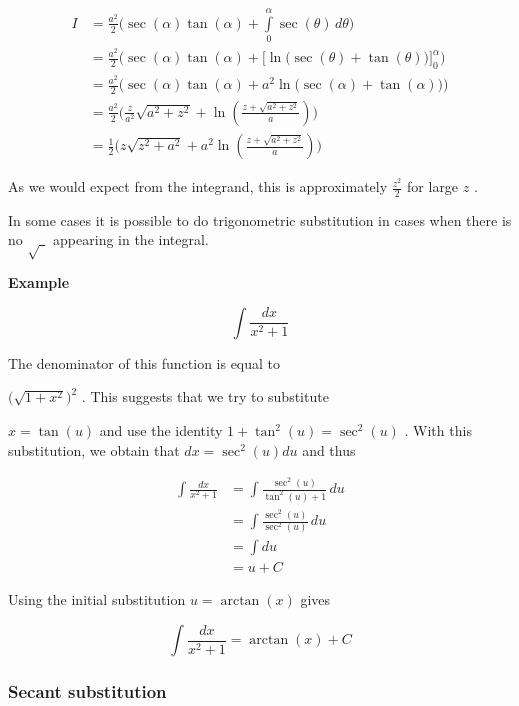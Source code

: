 \begin{align}
I &= \tfrac{a^2}{2}\Bigg(\sec(\alpha)\tan(\alpha) + \int\limits_0^\alpha \sec(\theta)\,d\theta\Bigg) \\&= \tfrac{a^2}{2}\Bigg(\sec(\alpha)\tan(\alpha) + \bigg[\ln\Big(\sec(\theta) + \tan(\theta)\Big)\bigg] _0^\alpha\Bigg) \\&= \tfrac{a^2}{2}\bigg(\sec(\alpha)\tan(\alpha) + a^2\ln\Big(\sec(\alpha) + \tan(\alpha)\Big)\bigg) \\&= \tfrac{a^2}{2}\bigg(\tfrac{z}{a^2}\sqrt{a^2 + z^2} + \ln\left(\tfrac{z + \sqrt{a^2 + z^2}}{a}\right)\bigg) \\&= \tfrac{1}{2}\bigg(z\sqrt{z^2 + a^2} + a^2\ln\left(\tfrac{z + \sqrt{a^2 + z^2}}{a}\right)\bigg)
\end{align}


As we would expect from the integrand, this is approximately $\frac{z^2}{2}$ for large $z$ .


In some cases it is possible to do trigonometric substitution in cases when there is no $\sqrt{\ \ }$ appearing in the integral.


\textbf{Example}


\[
\int\frac{dx}{x^2+1}
\]


The denominator of this function is equal to

$\bigl(\sqrt{1+x^2}\bigr)^2$ . This suggests that we try to substitute

$x=\tan(u)$ and use the identity $1+\tan^2(u)=\sec^2(u)$ . With this substitution, we obtain that $dx=\sec^2(u)du$ and thus


\begin{align}
\int\frac{dx}{x^2+1} &= \int\frac{\sec^2(u)}{\tan^2(u)+1}\,du \\&= \int\frac{\sec^2(u)}{\sec^2(u)}\,du \\&= \int du \\&= u + C
\end{align}


Using the initial substitution $u=\arctan(x)$ gives


\[
\int\frac{dx}{x^2+1}=\arctan(x)+C
\]


\subsubsection{Secant substitution}
\label{sss:seca-a19a}


